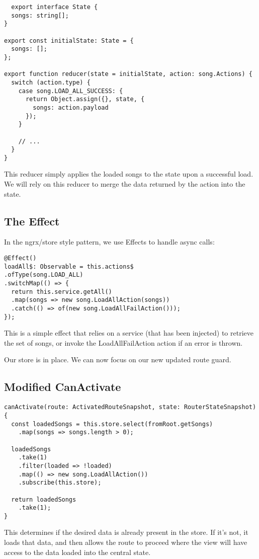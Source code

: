 \begin{lstlisting}
  export interface State {
  songs: string[];
}

export const initialState: State = {
  songs: [];
};

export function reducer(state = initialState, action: song.Actions) {
  switch (action.type) {
    case song.LOAD_ALL_SUCCESS: {
      return Object.assign({}, state, {
        songs: action.payload
      });
    }

    // ...
  }
}
\end{lstlisting}

This reducer simply applies the loaded songs to the state upon a successful
load.  We will rely on this reducer to merge the data returned by the action
into the state.

\subsection{The Effect}
In the ngrx/store style pattern, we use Effects to handle async calls:

\begin{lstlisting}
@Effect()
loadAll$: Observable = this.actions$
.ofType(song.LOAD_ALL)
.switchMap(() => {
  return this.service.getAll()
  .map(songs => new song.LoadAllAction(songs))
  .catch(() => of(new song.LoadAllFailAction()));
});
\end{lstlisting}

This is a simple effect that relies on a service (that has been injected) to
retrieve the set of songs, or invoke the LoadAllFailAction action if an error
is thrown.

Our store is in place. We can now focus on our new updated route guard.

\subsection{ Modified CanActivate }
\begin{lstlisting}
canActivate(route: ActivatedRouteSnapshot, state: RouterStateSnapshot) {
  const loadedSongs = this.store.select(fromRoot.getSongs)
    .map(songs => songs.length > 0);

  loadedSongs
    .take(1)
    .filter(loaded => !loaded)
    .map(() => new song.LoadAllAction())
    .subscribe(this.store);

  return loadedSongs
    .take(1);
}
\end{lstlisting}

This determines if the desired data is already present in the store. If it's
not, it loads that data, and then allows the route to proceed where the view
will have access to the data loaded into the central state.

